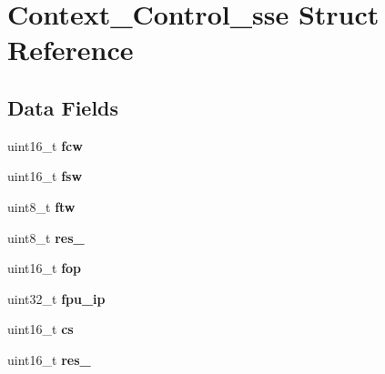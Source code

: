 \hypertarget{structContext__Control__sse}{}\section{Context\+\_\+\+Control\+\_\+sse Struct Reference}
\label{structContext__Control__sse}
\subsection*{Data Fields}
\begin{DoxyCompactItemize}
\item 
\mbox{\label{structContext__Control__sse_acc2ce10ebb4d16b0eb5317a2d903bc4f}} 
uint16\+\_\+t {\bfseries fcw}
\item 
\mbox{\label{structContext__Control__sse_a26e046843b5608d46c95afb8d89d04ea}} 
uint16\+\_\+t {\bfseries fsw}
\item 
\mbox{\label{structContext__Control__sse_a6af058a409dca6c03b5f63fbf33cb296}} 
uint8\+\_\+t {\bfseries ftw}
\item 
\mbox{\label{structContext__Control__sse_a8a0231bf7cd38ad43f5a3026ac7b3816}} 
uint8\+\_\+t {\bfseries res\+\_}
\item 
\mbox{\label{structContext__Control__sse_ae0901f5801dd1ecd94bd269847d11f74}} 
uint16\+\_\+t {\bfseries fop}
\item 
\mbox{\label{structContext__Control__sse_af9ee6bcb0870b7cb59da2b7c4aac0aa9}} 
uint32\+\_\+t {\bfseries fpu\+\_\+ip}
\item 
\mbox{\label{structContext__Control__sse_a98f08dba753f057df72890545c337024}} 
uint16\+\_\+t {\bfseries cs}
\item 
\mbox{\label{structContext__Control__sse_a6cc03a26fcfe1799168c24ee84cfd22d}} 
uint16\+\_\+t {\bfseries res\+\_}
\item 
\mbox{\label{structContext__Control__sse_a9b705993b293f487f858b6aae90df160}} 

\end{DoxyCompactItemize}
